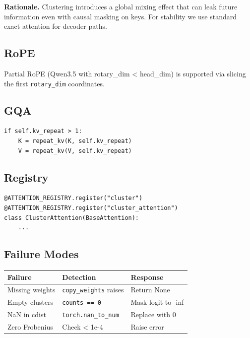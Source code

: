 \textbf{Rationale.} Clustering introduces a global mixing effect that can leak 
future information even with causal masking on keys. For stability we 
use standard exact attention for decoder paths.

\subsection{RoPE}

Partial RoPE (Qwen3.5 with rotary\_dim < head\_dim) is supported via slicing 
the first \texttt{rotary\_dim} coordinates.

\subsection{GQA}

\begin{lstlisting}
if self.kv_repeat > 1:
    K = repeat_kv(K, self.kv_repeat)
    V = repeat_kv(V, self.kv_repeat)
\end{lstlisting}

\subsection{Registry}

\begin{lstlisting}
@ATTENTION_REGISTRY.register("cluster")
@ATTENTION_REGISTRY.register("cluster_attention")
class ClusterAttention(BaseAttention):
    ...
\end{lstlisting}

\subsection{Failure Modes}

\begin{table}[H]
\centering
\small
\begin{tabular}{lll}
\toprule
\textbf{Failure} & \textbf{Detection} & \textbf{Response} \\
\midrule
Missing weights & \texttt{copy\_weights} raises & Return None \\
Empty clusters & \texttt{counts == 0} & Mask logit to -inf \\
NaN in cdist & \texttt{torch.nan\_to\_num} & Replace with 0 \\
Zero Frobenius & Check < 1e-4 & Raise error \\
\bottomrule
\end{tabular}
\end{table}

